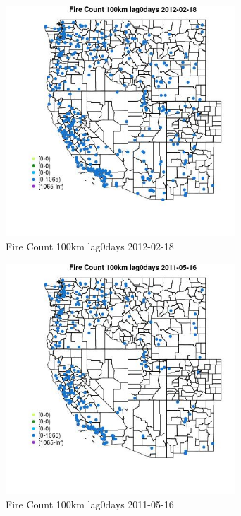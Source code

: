 \begin{figure} 
\centering  
\includegraphics[width=0.77\textwidth]{Code_Outputs/Report_ML_input_PM25_Step4_part_f_de_duplicated_aves_prioritize_24hr_obswNAs_MapObsFire_Count_100km_lag0days2012-02-18.jpg} 
\caption{\label{fig:Report_ML_input_PM25_Step4_part_f_de_duplicated_aves_prioritize_24hr_obswNAsMapObsFire_Count_100km_lag0days2012-02-18}Fire Count 100km lag0days 2012-02-18} 
\end{figure} 
 

\begin{figure} 
\centering  
\includegraphics[width=0.77\textwidth]{Code_Outputs/Report_ML_input_PM25_Step4_part_f_de_duplicated_aves_prioritize_24hr_obswNAs_MapObsFire_Count_100km_lag0days2011-05-16.jpg} 
\caption{\label{fig:Report_ML_input_PM25_Step4_part_f_de_duplicated_aves_prioritize_24hr_obswNAsMapObsFire_Count_100km_lag0days2011-05-16}Fire Count 100km lag0days 2011-05-16} 
\end{figure} 
 

